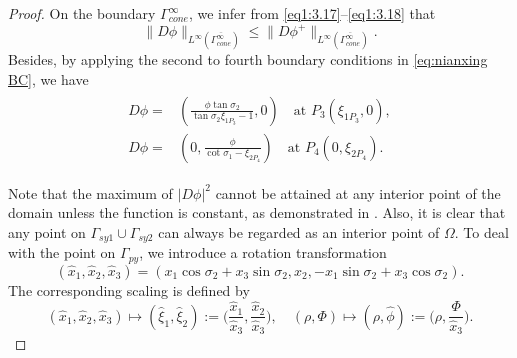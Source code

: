 \documentclass[reqno,12pt]{amsart}
\numberwithin{equation}{section}
\begin{document}
\begin{proof}
    On the boundary $\Gamma_{cone}^{\infty}$, we infer from \eqref{eq1:3.17}--\eqref{eq1:3.18} that
	\begin{equation}\label{eq:3.34}
		\|D{\phi}\|_{L^{\infty}(\overline{\Gamma_{cone}^{\infty}})}\leq \|D{\phi}^{+}\|_{L^{\infty}(\overline{\Gamma_{cone}^{\infty}})}.
	\end{equation}     
    Besides, by applying the second to fourth boundary conditions in \eqref{eq:nianxing BC}, we have
        \begin{align}\label{eq: D for P3P4}
            \begin{split}
	    D\phi=&(\frac{\phi\tan\sigma_2}{\tan\sigma_2\xi_{1P_3}-1},0)\quad\text{at  $P_3(\xi_{1P_3},0)$},\\
            D\phi=&(0,\frac{\phi}{\cot\sigma_1-\xi_{2P_4}})\quad\text{at $P_4(0,\xi_{2P_4})$}.
            \end{split}
	\end{align}	 
    
    Note that the maximum of $|D\phi|^{2}$ cannot be attained at any interior point of the domain unless the function is constant, as demonstrated in \cite[Lemma 3.5]{LY22}. Also, it is clear that any point on $\Gamma_{sy1}\cup\Gamma_{sy2}$ can always be regarded as an interior point of $\Omega$. To deal with the point on $\Gamma_{py}$, we introduce a rotation transformation
      \begin{equation}\label{eq:4.4}	(\hat{x}_{1},\hat{x}_{2},\hat{x}_{3})=(x_{1}\cos\sigma_2+x_{3}\sin\sigma_2,x_{2},-x_{1}\sin\sigma_2+x_{3}\cos\sigma_2).
      \end{equation}
    The corresponding scaling is defined by
    \begin{equation}\label{eq:4.5}	(\hat{x}_1,\hat{x}_2,\hat{x}_3)\longmapsto(\hat{\xi}_{1},\hat{\xi}_{2}):=\Big(\frac{\hat{x}_1}{\hat{x}_3},\frac{\hat{x}_2}{\hat{x}_3}\Big), \quad
	(\rho,\Phi)\longmapsto(\rho,\hat{\phi}):=\Big(\rho, \frac{\Phi}{\hat{x}_3}\Big).
    \end{equation}
      

\end{proof}
\end{document}
